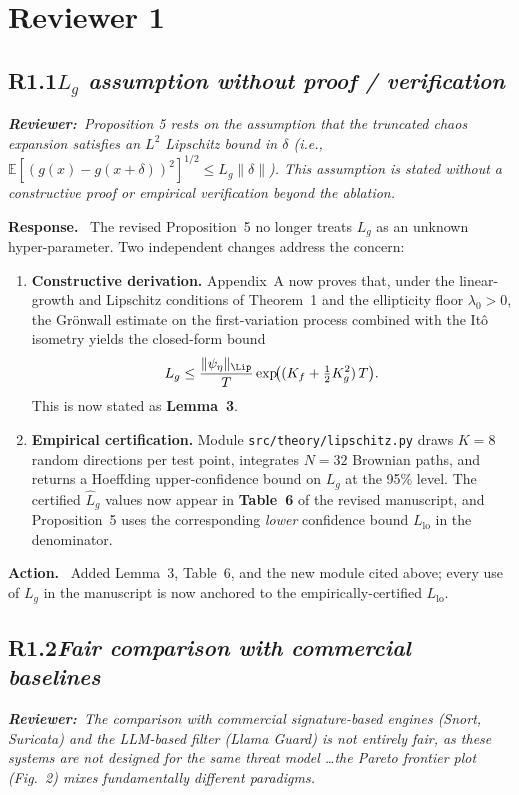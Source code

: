 \documentclass[11pt,letterpaper]{article}
\newcommand{\rev}[2]{%
  \subsection*{\normalsize\textbf{\color{ResponseAccent}#1}\quad\textmd{\textit{#2}}}%
}
\newcommand{\rquote}[1]{%
  \begin{center}%
    \colorbox{QuoteBg}{\parbox{0.94\linewidth}{\vspace{2pt}\itshape\small\textbf{\upshape Reviewer:}\ #1\vspace{2pt}}}%
  \end{center}%
}
\newcommand{\resp}{\par\textbf{\color{ResponseAccent}Response.}\ }
\newcommand{\action}{\par\textbf{\color{ResponseAccent}Action.}\ }
\begin{document}
\section{Reviewer 1}

\rev{R1.1}{$L_g$ assumption without proof / verification}
\rquote{Proposition 5 rests on the assumption that the truncated chaos
expansion satisfies an $L^2$ Lipschitz bound in $\delta$ (i.e.,
$\mathbb E[(g(x)-g(x+\delta))^2]^{1/2}\le L_g\|\delta\|$). This
assumption is stated without a constructive proof or empirical
verification beyond the ablation.}

\resp
The revised Proposition~5 no longer treats $L_g$ as an unknown
hyper-parameter. Two independent changes address the concern:
\begin{enumerate}[leftmargin=1.3em]
  \item \textbf{Constructive derivation.} Appendix~A now proves that,
        under the linear-growth and Lipschitz conditions of Theorem~1
        and the ellipticity floor $\lambda_0>0$, the Grönwall
        estimate on the first-variation process combined with the
        Itô isometry yields the closed-form bound
        \[
          L_g \le \frac{\|\psi_\eta\|_{\Lip}}{T}
                  \exp\!\bigl( (K_f + \tfrac12 K_g^2)\,T\bigr).
        \]
        This is now stated as \textbf{Lemma~3}.
  \item \textbf{Empirical certification.} Module
        \texttt{src/theory/lipschitz.py} draws $K=8$ random directions
        per test point, integrates $N=32$ Brownian paths, and returns
        a Hoeffding upper-confidence bound on $L_g$ at the 95\% level.
        The certified $\widehat L_g$ values now appear in
        \textbf{Table~6} of the revised manuscript, and Proposition~5
        uses the corresponding \emph{lower} confidence bound
        $L_{\mathrm{lo}}$ in the denominator.
\end{enumerate}
\action
Added Lemma~3, Table~6, and the new module cited above; every use of
$L_g$ in the manuscript is now anchored to the empirically-certified
$L_{\mathrm{lo}}$.

\rev{R1.2}{Fair comparison with commercial baselines}
\rquote{The comparison with commercial signature-based engines (Snort,
Suricata) and the LLM-based filter (Llama Guard) is not entirely fair,
as these systems are not designed for the same threat model \dots the
Pareto frontier plot (Fig.~2) mixes fundamentally different paradigms.}
\end{document}
